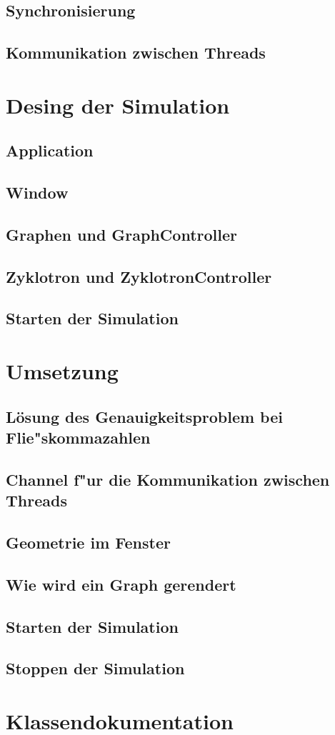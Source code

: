 \documentclass[14pt, a4paper]{report}
\begin{document}
\section{Synchronisierung}
\section{Kommunikation zwischen Threads}

\chapter{Desing der Simulation}
\section{Application}
\section{Window} 
\section{Graphen und GraphController}
\section{Zyklotron und ZyklotronController}
\section{Starten der Simulation}

\chapter{Umsetzung}
\section{Lösung des Genauigkeitsproblem bei Flie"skommazahlen}
\section{Channel f"ur die Kommunikation zwischen Threads}
\section{Geometrie im Fenster}
\section{Wie wird ein Graph gerendert}
\section{Starten der Simulation}
\section{Stoppen der Simulation}

\appendix
\chapter{Klassendokumentation}
\newpage
\end{document}
